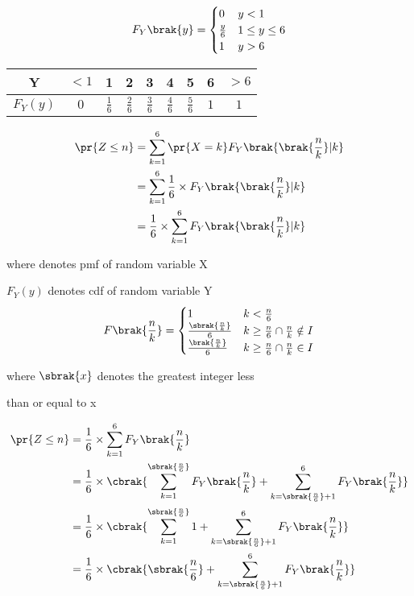 \documentclass[journal,12pt,twocolumn]{IEEEtran}
\begin{document}
\begin{align}
F_Y\brak{y}=
	\begin{cases}
		0 & y < 1\\
		\frac{y}{6} & 1 \leq y \leq 6\\
		1 & y > 6
	\end{cases}
\end{align}
\begin{tabular}{|c|c|c|c|c|c|c|c|c|}
        \hline
        Y & $< 1$ & 1 & 2 & 3 & 4 & 5 & 6 & $> 6$\\
        \hline
        $F_Y(y)$ & $0$ & $\frac{1}{6}$ & $\frac{2}{6}$ & $\frac{3}{6}$ & $\frac{4}{6}$ & $\frac{5}{6}$ & $1$ & $1$ \\
        \hline
    \end{tabular}


\begin{align}
\pr{Z \leq n} &= \sum_{k=1}^{6} \pr{X=k} F_Y\brak{\brak{\frac{n}{k}}|k}\\
&=\sum_{k=1}^{6} \frac{1}{6} \times F_Y\brak{\brak{\frac{n}{k}}|k}\\
&=\frac{1}{6}\times\sum_{k=1}^{6} F_Y\brak{\brak{\frac{n}{k}}|k}
\end{align}

where  denotes pmf of random variable X

$F_Y(y)$ denotes cdf of random variable Y
\begin{align}
F\brak{\frac{n}{k}}=
	\begin{cases}
		1 & k < \frac{n}{6}\\
		\frac{\sbrak{\frac{n}{k}}}{6} & k \geq \frac{n}{6} \cap \frac{n}{k} \notin I\\
		\frac{\brak{\frac{n}{k}}}{6} & k \geq \frac{n}{6} \cap \frac{n}{k} \in I
	\end{cases}
\end{align}

where $\sbrak {x}$ denotes the greatest integer less 

than or equal to x

\begin{align}
\pr{Z \leq n} &= \frac{1}{6} \times \sum_{k=1}^{6} F_Y\brak{\frac{n}{k}}\\
&=\frac{1}{6} \times \cbrak{\sum_{k=1}^{\sbrak{\frac{n}{6} }} F_Y\brak{\frac{n}{k}}+\sum_{k=\sbrak{\frac{n}{6}} + 1}^{6} F_Y\brak{\frac{n}{k}}}\\
&=\frac{1}{6} \times \cbrak{\sum_{k=1}^{\sbrak{\frac{n}{6} }} 1+\sum_{k=\sbrak{ \frac{n}{6} } + 1}^{6} F_Y\brak{\frac{n}{k}}}\\
&=\frac{1}{6} \times \cbrak{\sbrak {\frac{n}{6} } +\sum_{k=\sbrak{\frac{n}{6} } + 1}^{6} F_Y\brak{\frac{n}{k}}}
\end{align}
\end{document}
